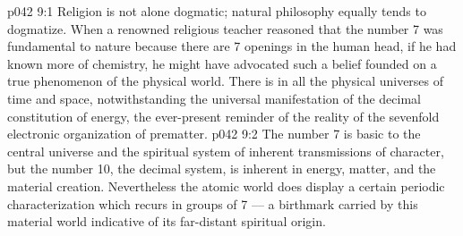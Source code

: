 \vs p042 9:1 Religion is not alone dogmatic; natural philosophy equally tends to dogmatize. When a renowned religious teacher reasoned that the number 7 was fundamental to nature because there are 7 openings in the human head, if he had known more of chemistry, he might have advocated such a belief founded on a true phenomenon of the physical world. There is in all the physical universes of time and space, notwithstanding the universal manifestation of the decimal constitution of energy, the ever\hyp{}present reminder of the reality of the sevenfold electronic organization of prematter.
\vs p042 9:2 The number 7 is basic to the central universe and the spiritual system of inherent transmissions of character, but the number 10, the decimal system, is inherent in energy, matter, and the material creation. Nevertheless the atomic world does display a certain periodic characterization which recurs in groups of 7 --- a birthmark carried by this material world indicative of its far\hyp{}distant spiritual origin.

